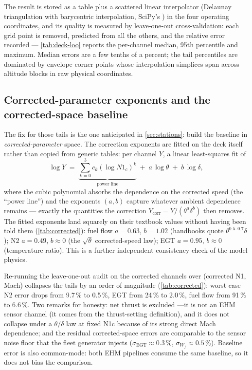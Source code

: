 The result is stored as a table plus a scattered linear interpolator (Delaunay triangulation
with barycentric interpolation, SciPy's ) in the four operating
coordinates, and its quality is measured by leave-one-out cross-validation: each grid point is
removed, predicted from all the others, and the relative error recorded ---
\cref{tab:deck-loo} reports the per-channel median, 95th percentile and maximum. Median errors
are a few tenths of a percent; the tail percentiles are dominated by envelope-corner points
whose interpolation simplices span across altitude blocks in raw physical coordinates.

\subsection{Corrected-parameter exponents and the corrected-space baseline}
\label{sec:corrected-baseline}

The fix for those tails is the one anticipated in \cref{sec:stations}: build the baseline in
\emph{corrected-parameter} space. The correction exponents are fitted on the deck itself
rather than copied from generic tables: per channel $Y$, a linear least-squares fit of
\begin{equation}
  \log Y \;=\; \underbrace{\textstyle\sum_{k=0}^{3} c_k \left(\log N1_c\right)^{k}}_{\text{power line}}
  \;+\; a\,\log\theta \;+\; b\,\log\delta,
  \label{eq:exponent-fit}
\end{equation}
where the cubic polynomial absorbs the dependence on the corrected speed (the ``power line'')
and the exponents $(a, b)$ capture whatever ambient dependence remains --- exactly the
quantities the correction $Y_{\mathrm{corr}} = Y/(\theta^a \delta^b)$ then removes. The fitted exponents
land squarely on their textbook values without having been told them (\cref{tab:corrected}):
fuel flow $a=0.63$, $b=1.02$ (handbooks quote $\theta^{0.5\text{--}0.7}\delta$); N2
$a=0.49$, $b\approx0$ (the $\sqrt{\theta}$ corrected-speed law); EGT $a=0.95$, $b\approx0$
(temperature ratio). This is a further independent consistency check of the model physics.

Re-running the leave-one-out audit on the corrected channels over (corrected N1, Mach)
collapses the tails by an order of magnitude (\cref{tab:corrected}): worst-case N2 error drops
from 9.7\,\% to 0.5\,\%, EGT from 24\,\% to 2.0\,\%, fuel flow from 91\,\% to 6.6\,\%. Two
remarks for honesty: net thrust is excluded ---it is not an EHM sensor channel (it comes from
the thrust-setting definition), and it does not collapse under a $\theta$/$\delta$ law at fixed
N1c because of its strong direct Mach dependence; and the residual corrected-space errors are
comparable to the sensor noise floor that the fleet generator injects ($\sigma_{\mathrm{EGT}}
\approx 0.3\,\%$, $\sigma_{W_f} \approx 0.5\,\%$). Baseline error is also common-mode: both EHM
pipelines consume the same baseline, so it does not bias the comparison.

